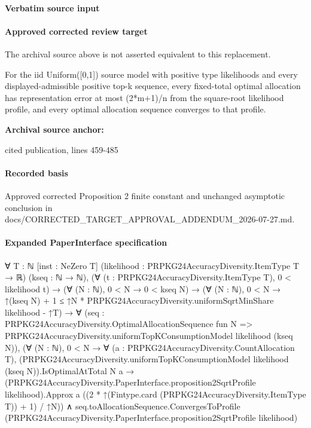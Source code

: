 \documentclass[10pt]{article}
\begin{document}
\paragraph{Verbatim source input}
\begin{ReviewVerbatim}
\end{ReviewVerbatim}

\paragraph{Approved corrected review target}
The archival source above is not asserted equivalent to this replacement.
\begin{ReviewVerbatim}
For the iid Uniform([0,1]) source model with positive type likelihoods and every displayed-admissible positive top-k sequence, every fixed-total optimal allocation has representation error at most (2*m+1)/n from the square-root likelihood profile, and every optimal allocation sequence converges to that profile.
\end{ReviewVerbatim}

\textbf{Archival source anchor:} {\footnotesize\raggedright cited publication, lines 459-\allowbreak{}485\par}
\paragraph{Recorded basis}
Approved corrected Proposition 2 finite constant and unchanged asymptotic conclusion in docs/\allowbreak{}CORRECTED\_\allowbreak{}TARGET\_\allowbreak{}APPROVAL\_\allowbreak{}ADDENDUM\_\allowbreak{}2026-\allowbreak{}07-\allowbreak{}27.\allowbreak{}md.\allowbreak{}
\paragraph{Expanded PaperInterface specification}
\begin{ReviewVerbatim}
∀ {T : ℕ} [inst : NeZero T] (likelihood : PRPKG24AccuracyDiversity.ItemType T → ℝ) (kseq : ℕ → ℕ),
  (∀ (t : PRPKG24AccuracyDiversity.ItemType T), 0 < likelihood t) →
    (∀ (N : ℕ), 0 < N → 0 < kseq N) →
      (∀ (N : ℕ), 0 < N → ↑(kseq N) + 1 ≤ ↑N * PRPKG24AccuracyDiversity.uniformSqrtMinShare likelihood - ↑T) →
        ∀
          (seq :
            PRPKG24AccuracyDiversity.OptimalAllocationSequence fun N =>
              PRPKG24AccuracyDiversity.uniformTopKConsumptionModel likelihood (kseq N)),
          (∀ (N : ℕ),
              0 < N →
                ∀ (a : PRPKG24AccuracyDiversity.CountAllocation T),
                  (PRPKG24AccuracyDiversity.uniformTopKConsumptionModel likelihood (kseq N)).IsOptimalAtTotal N a →
                    (PRPKG24AccuracyDiversity.PaperInterface.proposition2SqrtProfile likelihood).Approx a
                      ((2 * ↑(Fintype.card (PRPKG24AccuracyDiversity.ItemType T)) + 1) / ↑N)) ∧
            seq.toAllocationSequence.ConvergesToProfile
              (PRPKG24AccuracyDiversity.PaperInterface.proposition2SqrtProfile likelihood)
\end{ReviewVerbatim}
\end{document}
